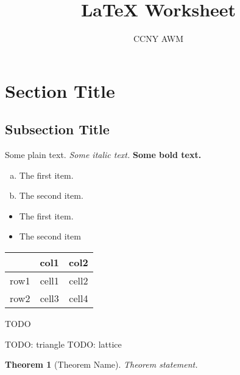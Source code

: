 \documentclass[11pt, reqno]{amsart}
\theoremstyle{plain}
\newtheorem{thm}{Theorem}[section]
\theoremstyle{definition}
\theoremstyle{example}
\begin{document}
\title{LaTeX Worksheet}
\author{CCNY AWM}
\maketitle

\section{Section Title}
\subsection{Subsection Title}
Some plain text. 
\textit{Some italic text.}
\textbf{Some bold text.}

\begin{enumerate}[a)]
	\item The first item.
	\item The second item.
\end{enumerate}

\begin{itemize}
	\item The first item. 
	\item The second item
\end{itemize}

\begin{center}
	\begin{tabular}{ | c || c | c | } \hline
			 & col1  & col2  \\ \hline \hline
		row1 & cell1 & cell2 \\ \hline 
		row2 & cell3 & cell4 \\ \hline
	\end{tabular}
\end{center}

TODO

TODO: triangle 
TODO: lattice 

\begin{thm}[Theorem Name]
	Theorem statement.
\end{thm}
\end{document}
